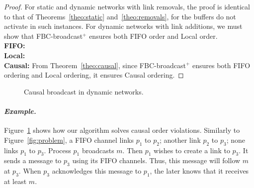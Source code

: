 \begin{proof}
  For static and dynamic networks with link removals, the proof is identical to
  that of Theorems~\ref{theo:static} and~\ref{theo:removals}, for the buffers do
  not activate in such instances. For dynamic networks with link additions, we
  must show that FBC-broadcast$^+$ ensures both
  FIFO order and Local order. \\
  \textbf{FIFO:}  \\
  \textbf{Local:}  \\
  \textbf{Causal:} From Theorem~\ref{theo:causal}, since FBC-broadcast$^+$
  ensures both FIFO ordering and Local ordering, it ensures Causal ordering.
\end{proof}

\begin{figure}
  \begin{center}
    
    \caption{\label{fig:solved}Causal broadcast in dynamic networks. }
  \end{center}
\end{figure}

\paragraph{\emph{Example.}} Figure~\ref{fig:solved} shows how our algorithm solves
causal order violations. Similarly to Figure~\ref{fig:problem}, a FIFO channel
links $p_1$ to $p_2$; another link $p_2$ to $p_3$; none links $p_1$ to
$p_3$. Process $p_1$ broadcasts $m$. Then $p_1$ wishes to create a link to
$p_3$. It sends a message to $p_3$ using its FIFO channels. Thus, this message
will follow $m$ at $p_3$. When $p_3$ acknowledges this message to $p_1$, the
later knows that it receives at least $m$. 

